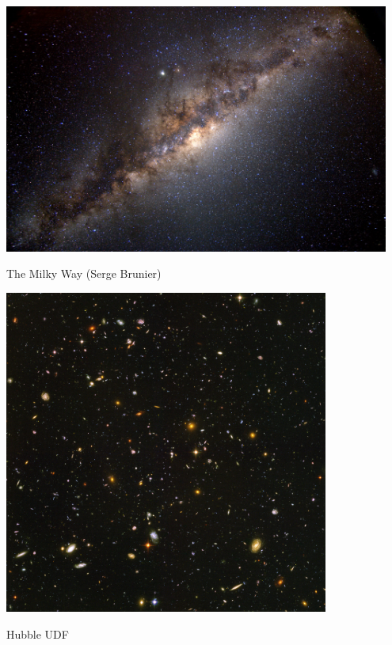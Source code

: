 \documentclass{beamer}
\begin{document}
\frame
{
    \begin{center}
        \includegraphics[width=0.95\textwidth]{16500feetmilkywaykc2_brunier.jpg}
    \end{center}
    {\normalsize The Milky Way (Serge Brunier)}
}


\frame
{
    \begin{center}
        \includegraphics[width=0.8\textwidth]{UDF_half.jpg}
    \end{center}
    {\normalsize Hubble UDF}
}
\end{document}
